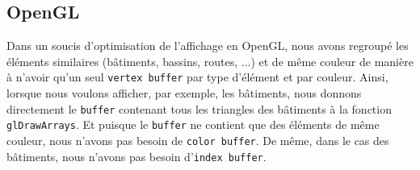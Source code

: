 \subsection{OpenGL}

Dans un soucis d'optimisation de l'affichage en OpenGL, nous avons regroupé les éléments similaires (bâtiments, bassins, routes, ...) et de même couleur de manière à n'avoir qu'un seul \texttt{vertex buffer} par type d'élément et par couleur. Ainsi, lorsque nous voulons afficher, par exemple, les bâtiments, nous donnons directement le \texttt{buffer} contenant tous les triangles des bâtiments à la fonction \texttt{glDrawArrays}. Et puisque le \texttt{buffer} ne contient que des éléments de même couleur, nous n'avons pas besoin de \texttt{color buffer}. De même, dans le cas des bâtiments, nous n'avons pas besoin d'\texttt{index buffer}.